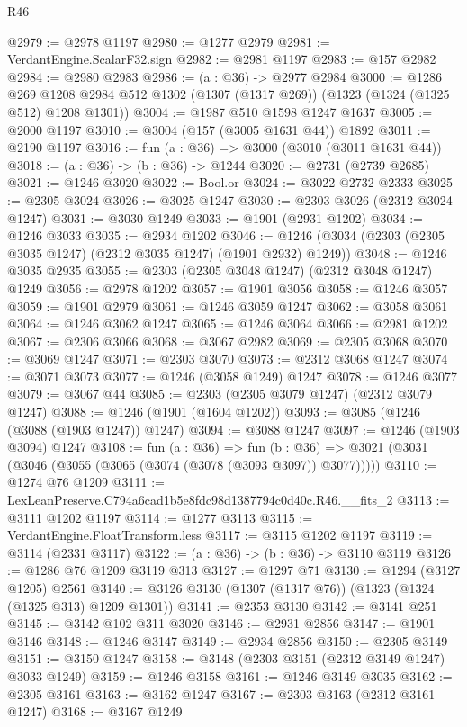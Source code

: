 \begin{lexlean}{R46}
\begin{coremodule}
@2979 := @2978 @1197
@2980 := @1277 @2979
@2981 := VerdantEngine.ScalarF32.sign
@2982 := @2981 @1197
@2983 := @157 @2982
@2984 := @2980 @2983
@2986 := (a : @36) -> @2977 @2984
@3000 := @1286
    @269
    @1208
    @2984
    @512
    @1302
    (@1307 (@1317 @269))
    (@1323 (@1324 (@1325 @512) @1208 @1301))
@3004 := @1987 @510 @1598 @1247 @1637
@3005 := @2000 @1197
@3010 := @3004 (@157 (@3005 @1631 @44)) @1892
@3011 := @2190 @1197
@3016 := fun (a : @36) => @3000 (@3010 (@3011 @1631 @44))
@3018 := (a : @36) -> (b : @36) -> @1244
@3020 := @2731 (@2739 @2685)
@3021 := @1246 @3020
@3022 := Bool.or
@3024 := @3022 @2732 @2333
@3025 := @2305 @3024
@3026 := @3025 @1247
@3030 := @2303 @3026 (@2312 @3024 @1247)
@3031 := @3030 @1249
@3033 := @1901 (@2931 @1202)
@3034 := @1246 @3033
@3035 := @2934 @1202
@3046 := @1246 (@3034 (@2303 (@2305 @3035 @1247) (@2312 @3035 @1247) (@1901 @2932) @1249))
@3048 := @1246 @3035 @2935
@3055 := @2303 (@2305 @3048 @1247) (@2312 @3048 @1247) @1249
@3056 := @2978 @1202
@3057 := @1901 @3056
@3058 := @1246 @3057
@3059 := @1901 @2979
@3061 := @1246 @3059 @1247
@3062 := @3058 @3061
@3064 := @1246 @3062 @1247
@3065 := @1246 @3064
@3066 := @2981 @1202
@3067 := @2306 @3066
@3068 := @3067 @2982
@3069 := @2305 @3068
@3070 := @3069 @1247
@3071 := @2303 @3070
@3073 := @2312 @3068 @1247
@3074 := @3071 @3073
@3077 := @1246 (@3058 @1249) @1247
@3078 := @1246 @3077
@3079 := @3067 @44
@3085 := @2303 (@2305 @3079 @1247) (@2312 @3079 @1247)
@3088 := @1246 (@1901 (@1604 @1202))
@3093 := @3085 (@1246 (@3088 (@1903 @1247)) @1247)
@3094 := @3088 @1247
@3097 := @1246 (@1903 @3094) @1247
@3108 := fun (a : @36) =>
  fun (b : @36) => @3021 (@3031 (@3046 (@3055 (@3065 (@3074 (@3078 (@3093 @3097)) @3077)))))
@3110 := @1274 @76 @1209
@3111 := LexLeanPreserve.C794a6cad1b5e8fdc98d1387794c0d40c.R46.__fits_2
@3113 := @3111 @1202 @1197
@3114 := @1277 @3113
@3115 := VerdantEngine.FloatTransform.less
@3117 := @3115 @1202 @1197
@3119 := @3114 (@2331 @3117)
@3122 := (a : @36) -> (b : @36) -> @3110 @3119
@3126 := @1286 @76 @1209 @3119 @313
@3127 := @1297 @71
@3130 := @1294 (@3127 @1205) @2561
@3140 := @3126 @3130 (@1307 (@1317 @76)) (@1323 (@1324 (@1325 @313) @1209 @1301))
@3141 := @2353 @3130
@3142 := @3141 @251
@3145 := @3142 @102 @311 @3020
@3146 := @2931 @2856
@3147 := @1901 @3146
@3148 := @1246 @3147
@3149 := @2934 @2856
@3150 := @2305 @3149
@3151 := @3150 @1247
@3158 := @3148 (@2303 @3151 (@2312 @3149 @1247) @3033 @1249)
@3159 := @1246 @3158
@3161 := @1246 @3149 @3035
@3162 := @2305 @3161
@3163 := @3162 @1247
@3167 := @2303 @3163 (@2312 @3161 @1247)
@3168 := @3167 @1249

\end{coremodule}
\end{lexlean}
